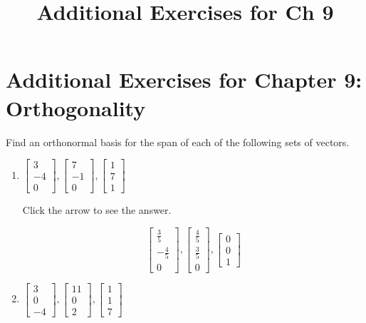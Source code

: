\documentclass{ximera}
\title{Additional Exercises for Ch 9} \license{CC BY-NC-SA 4.0}
\begin{document}
\begin{abstract}
\end{abstract}
\maketitle

\section*{Additional Exercises for Chapter 9: Orthogonality}

\begin{problem}\label{prob:find_ortho_basis_span}

Find an orthonormal basis for the span of each of the following sets of
vectors.

\begin{enumerate}
\item $\left[
\begin{array}{r}
 3 \\
-4 \\
0
\end{array}
\right] ,\left[
\begin{array}{r}
 7 \\
-1 \\
0
\end{array}
\right] ,\left[
\begin{array}{r}
 1 \\
7 \\
1
\end{array}
\right] $

Click the arrow to see the answer.
\begin{expandable}
\[
\left[
\begin{array}{c}
\frac{3}{5} \\
-\frac{4}{5} \\
0
\end{array}
\right] ,\left[
\begin{array}{c}
\frac{4}{5} \\
\frac{3}{5} \\
0
\end{array}
\right] ,\left[
\begin{array}{c}
0 \\
0 \\
1
\end{array}
\right]
\]
\end{expandable}

\item $\left[
\begin{array}{r}
3 \\
0 \\
-4
\end{array}
\right] ,\left[
\begin{array}{r}
 11 \\
0 \\
2
\end{array}
\right] ,\left[
\begin{array}{r}
1 \\
1 \\
7
\end{array}
\right] $


\end{enumerate}
\end{problem}
\end{document}
